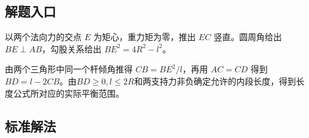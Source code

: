 \documentclass[UTF8,fontset=fandol,a4paper,11pt]{ctexart}
\begin{document}

\subsection*{解题入口}

以两个法向力的交点 $E$ 为矩心，重力矩为零，推出 $EC$ 竖直。圆周角给出 $BE\perp AB$，勾股关系给出 $BE^2=4R^2-l^2$。

由两个三角形中同一个杆倾角推得 $CB=BE^2/l$，再用 $AC=CD$ 得到 $BD=l-2CB$。由$BD\ge0,l\le2R$和两支持力非负确定允许的内段长度，得到长度公式所对应的实际平衡范围。



\subsection*{标准解法}
\end{document}
